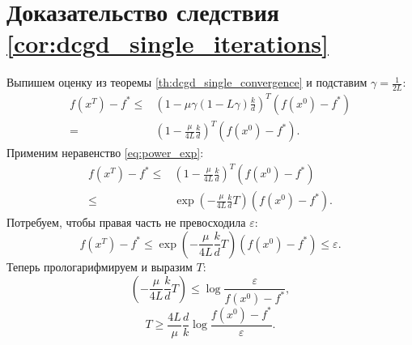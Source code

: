 \section{Доказательство следствия \ref{cor:dcgd_single_iterations}} \label{app:dcgd_single_iterations_proof}
    Выпишем оценку из теоремы \ref{th:dcgd_single_convergence} и подставим $\gamma = \frac{1}{2L}$:
    \begin{align*}
        f(x^T) - f^* \leq& \left(1 - \mu \gamma \left(1 - L \gamma\right) \frac{k}{d} \right)^T (f(x^0) - f^*) \\
        =& \left(1 - \frac{\mu}{4L} \frac{k}{d} \right)^T (f(x^0) - f^*).
    \end{align*}
    Применим неравенство \eqref{eq:power_exp}:
    \begin{align*}
        f(x^T) - f^* \leq& \left(1 - \frac{\mu}{4L} \frac{k}{d} \right)^T (f(x^0) - f^*)\\
        \leq& \exp\left(-\frac{\mu}{4L} \frac{k}{d} T\right) (f(x^0) - f^*).
    \end{align*}
    Потребуем, чтобы правая часть не превосходила $\varepsilon$:
    \begin{equation*}
        f(x^T) - f^* \leq \exp\left(-\frac{\mu}{4L} \frac{k}{d} T\right) (f(x^0) - f^*) \leq \varepsilon.
    \end{equation*}
    Теперь прологарифмируем и выразим $T$:
    \begin{equation*}
        \left(-\frac{\mu}{4L} \frac{k}{d} T\right) \leq \log \frac{\varepsilon}{f(x^0) - f^*},
    \end{equation*}
    \begin{equation*}
        T \geq \frac{4L}{\mu} \frac{d}{k} \log \frac{f(x^0) - f^*}{\varepsilon}.
    \end{equation*}

